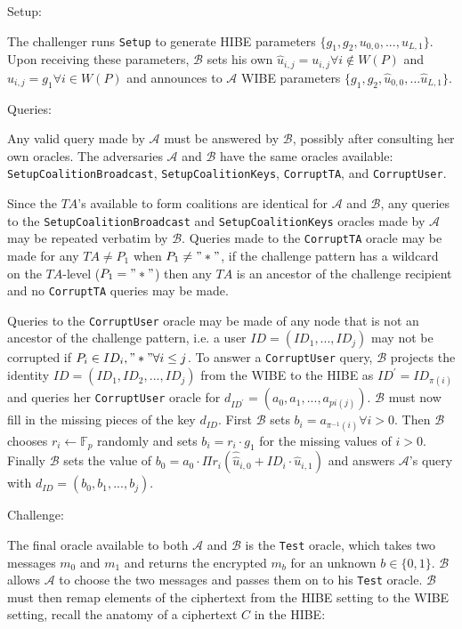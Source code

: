 \documentclass[10pt]{article}
\newcommand{\A}{\mathcal{A}}
\newcommand{\B}{\mathcal{B}}
\newcommand{\TA}{\mathit{TA}}
\begin{document}
Setup:

The challenger runs \texttt{Setup} to generate HIBE parameters $\{g_1, g_2, u_{0,0}, ..., u_{L,1}\}$.  Upon receiving these parameters, $\B$ sets his own $\hat u_{i, j} = u_{i,j} \forall i \not\in W(P)$ and $\hat u_{i,j} = g_1 \forall i \in W(P)$ and announces to $\A$ WIBE parameters $\{g_1, g_2, \hat u_{0,0}, ... \hat u_{L,1}\}$.

Queries:

Any valid query made by $\A$ must be answered by $\B$, possibly after consulting her own oracles.  The adversaries $\A$ and $\B$ have the same oracles available: \texttt{SetupCoalitionBroadcast}, \texttt{SetupCoalitionKeys}, \texttt{CorruptTA}, and \texttt{CorruptUser}.

Since the $\TA$'s available to form coalitions are identical for $\A$ and $\B$, any queries to the \texttt{SetupCoalitionBroadcast} and \texttt{SetupCoalitionKeys} oracles made by $\A$ may be repeated verbatim by $\B$.  Queries made to the \texttt{CorruptTA} oracle may be made for any $\TA \neq P_1$ when $P_1 \neq "*"$, if the challenge pattern has a wildcard on the $\TA$-level ($P_1 = "*"$) then any $\TA$ is an ancestor of the challenge recipient and no \texttt{CorruptTA} queries may be made.

Queries to the \texttt{CorruptUser} oracle may be made of any node that is not an ancestor of the challenge pattern, i.e. a user $ID = (ID_1, ..., ID_j)$ may not be corrupted if $P_i \in {ID_i, "*"} \forall i \le j$. To answer a \texttt{CorruptUser} query, $\B$ projects the identity $ID = (ID_1, ID_2, ..., ID_j)$ from the WIBE to the HIBE as $ID^\prime = ID_{\pi(i)}$ and queries her \texttt{CorruptUser} oracle for $d_{ID^\prime} = (a_0, a_1, ..., a_{pi(j)})$.  $\B$ must now fill in the missing pieces of the key $d_{ID}$.  First $\B$ sets $b_i = a_{\pi^{-1}(i)} \forall i > 0$.  Then $\B$ chooses $r_i \leftarrow \mathbb{F}_p$ randomly and sets $b_i = r_i \cdot g_1$ for the missing values of $i > 0$.  Finally $\B$ sets the value of $b_0 = a_0 \cdot \Pi r_i(\hat \hat u_{i,0} + ID_i \cdot \hat u_{i,1})$ and answers $\A$'s query with $d_{ID} = (b_0, b_1, ..., b_j)$.

Challenge:

The final oracle available to both $\A$ and $\B$ is the \texttt{Test} oracle, which takes two messages $m_0$ and $m_1$ and returns the encrypted $m_b$ for an unknown $b \in \{0,1\}$.  $\B$ allows $\A$ to choose the two messages and passes them on to his \texttt{Test} oracle.  $\B$ must then remap elements of the ciphertext from the HIBE setting to the WIBE setting, recall the anatomy of a ciphertext $C$ in the HIBE:
\end{document}
